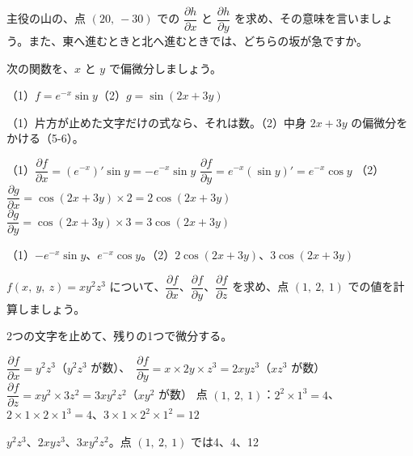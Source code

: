 \begin{jibun}
主役の山の、点 $(20,\ -30)$ での $\dfrac{\partial h}{\partial x}$ と $\dfrac{\partial h}{\partial y}$ を求め、その意味を言いましょう。また、東へ進むときと北へ進むときでは、どちらの坂が急ですか。
\end{jibun}

\begin{reidai}
次の関数を、$x$ と $y$ で偏微分しましょう。\par
（1）$f=e^{-x}\sin y$\qquad（2）$g=\sin(2x+3y)$\par
\kangaekata（1）片方が止めた文字だけの式なら、それは数。（2）中身 $2x+3y$ の偏微分をかける（5-6）。\par
\shiki（1）$\dfrac{\partial f}{\partial x}=(e^{-x})'\sin y=-e^{-x}\sin y$\kviiicq
$\dfrac{\partial f}{\partial y}=e^{-x}(\sin y)'=e^{-x}\cos y$\kviiicq
（2）$\dfrac{\partial g}{\partial x}=\cos(2x+3y)\times2=2\cos(2x+3y)$\kviiicq
$\dfrac{\partial g}{\partial y}=\cos(2x+3y)\times3=3\cos(2x+3y)$\par
\kotae（1）\nobreak $-e^{-x}\sin y$、$e^{-x}\cos y$。（2）\nobreak $2\cos(2x+3y)$、$3\cos(2x+3y)$
\end{reidai}



\begin{reidai}[3つの変数の偏微分]
$f(x,\ y,\ z)=xy^2z^3$ について、$\dfrac{\partial f}{\partial x}$、$\dfrac{\partial f}{\partial y}$、$\dfrac{\partial f}{\partial z}$ を求め、点 $(1,\ 2,\ 1)$ での値を計算しましょう。\par
\kangaekata 2つの文字を止めて、残りの1つで微分する。\par
\shiki $\dfrac{\partial f}{\partial x}=y^2z^3$（$y^2z^3$ が数）、\ $\dfrac{\partial f}{\partial y}=x\times2y\times z^3=2xyz^3$（$xz^3$ が数）\kviiicq
$\dfrac{\partial f}{\partial z}=xy^2\times3z^2=3xy^2z^2$（$xy^2$ が数）\kviiicq
点 $(1,\ 2,\ 1)$：$2^2\times1^3=4$、$2\times1\times2\times1^3=4$、$3\times1\times2^2\times1^2=12$\par
\kotae $y^2z^3$、$2xyz^3$、$3xy^2z^2$。点 $(1,\ 2,\ 1)$ では4、4、12
\end{reidai}


